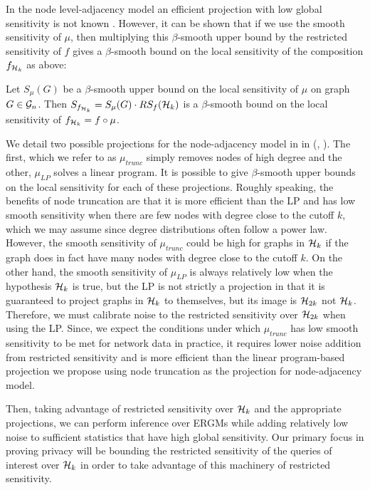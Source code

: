 In the node level-adjacency model an efficient projection with low global sensitivity is not known \cite{KNRS13}. However, it can be shown that if we use the smooth sensitivity of $\mu$, then multiplying this $\beta$-smooth upper bound by the restricted sensitivity of $f$ gives a $\beta$-smooth bound on the local sensitivity of the composition $f_{\mathcal{H}_{k}}$ as above:

\begin{lemma}
	\label{lemma:restricted_sensitivity_global}
	Let $S_\mu(G)$ be a $\beta$-smooth upper bound on the local sensitivity of $\mu$ on graph $G \in \mathcal{G}_n$. Then $S_{f_{\mathcal{H}_k}} = S_\mu(G) \cdot RS_f(\mathcal{H}_k)$ is a $\beta$-smooth bound on the local sensitivity of $f_{\mathcal{H}_{k}} = f \circ \mu$.
\end{lemma}

We detail two possible projections for the node-adjacency model in in  (\cite{KNRS13}, \cite{BBDS13}). The first, which we refer to as $\mu_{trunc}$ simply removes nodes of high degree and the other, $\mu_{LP}$ solves a linear program. It is possible to give $\beta$-smooth upper bounds on the local sensitivity for each of these projections. Roughly speaking, the benefits of node truncation are that it is more efficient than the LP and has low smooth sensitivity when there are few nodes with degree close to the cutoff $k$, which we may assume since degree distributions often follow a power law. However, the smooth sensitivity of $\mu_{trunc}$ could be high for graphs in $\mathcal{H}_k$ if the graph does in fact have many nodes with degree close to the cutoff $k$. On the other hand, the smooth sensitivity of $\mu_{LP}$ is always relatively low when the hypothesis $\mathcal{H}_k$ is true, but the LP is not strictly a projection in that it is guaranteed to project graphs in $\mathcal{H}_k$ to themselves, but its image is $\mathcal{H}_{2k}$ not $\mathcal{H}_k$. Therefore, we must calibrate noise to the restricted sensitivity over $\mathcal{H}_{2k}$ when using the LP. Since, we expect the conditions under which $\mu_{trunc}$ has low smooth sensitivity to be met for network data in practice, it requires lower noise addition from restricted sensitivity and is more efficient than the linear program-based projection we propose using node truncation as the projection for node-adjacency model. 

 Then, taking advantage of restricted sensitivity over $\mathcal{H}_k$ and the appropriate projections, we can perform inference over ERGMs while adding relatively low noise to sufficient statistics that have high global sensitivity.  Our primary focus in proving privacy will be bounding the restricted sensitivity of the queries of interest over $\mathcal{H}_k$ in order to take advantage of this machinery of restricted sensitivity.